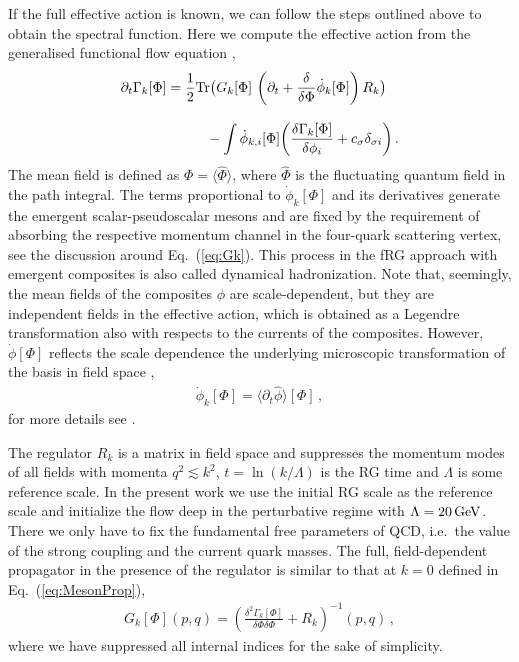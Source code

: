 \documentclass[reprint,english,superscriptaddress,preprintnumbers,amsmath,amssymb,aps,prd,nofootinbib]{revtex4-2}
\def\Eq#1{Eq.~(\ref{#1})}
\begin{document}
If the full effective action is known, we can follow the steps outlined above to obtain the spectral function. Here we compute the effective action from the generalised functional flow equation \cite{Pawlowski:2005xe, Fu:2019hdw}, 
%
\begin{align}\nonumber 
    \partial_t \Gamma_k[\Phi] &= \frac{1}{2}{\rm Tr} \big( G_k[\Phi]\, \left( \partial_t +\frac{\delta}{\delta \Phi} \dot\phi_k[\Phi] \right)  R_k\big)\\[2ex]
   &\hspace{1cm}- \int \dot\phi_{k,i}[\Phi] \bigg(\frac{\delta\Gamma_k[\Phi]}{\delta\phi_i}  + c_\sigma \delta_{\sigma i}\bigg)\,.
   \label{eq:flow}
\end{align}
% 
The mean field is defined as $\Phi = \langle \hat\Phi\rangle$, where $\hat\Phi$ is the fluctuating quantum field in the path integral.
The terms proportional to $\dot \phi_k[\Phi]$ and its derivatives generate the emergent scalar-pseudoscalar mesons and are fixed by the requirement of absorbing the respective momentum channel in the four-quark scattering vertex, see the discussion around \Eq{eq:Gk}. This process in the fRG approach with emergent composites is also called dynamical hadronization. Note that, seemingly, the mean fields of the composites $\phi$ are scale-dependent, but they are independent fields in the effective action, which is obtained as a Legendre transformation also with respects to the currents of the composites. However, $\dot\phi[\Phi]$ reflects the scale dependence the underlying microscopic transformation of the basis in field space \cite{Pawlowski:2005xe}, 
%
\begin{align}
    \dot\phi_k[\Phi] = \langle \partial_t \hat\phi\rangle[\Phi]\,, 
\end{align}
%
for more details see \cite{Pawlowski:2005xe, Fu:2019hdw, Ihssen:2024ihp}. 

The regulator $R_k$ is a matrix in field space and suppresses the momentum modes of all fields with momenta $q^2 \!\lesssim\! k^2$, $t = \ln(k/\Lambda)$ is the RG time and $\Lambda$ is some reference scale. In the present work we use the initial RG scale as the reference scale and initialize the flow deep in the perturbative regime with $\Lambda = 20\, {\rm GeV}$. There we only have to fix the fundamental free parameters of QCD, i.e.\ the value of the strong coupling and the current quark masses. 
The full, field-dependent propagator in the presence of the regulator is similar to that at $k=0$ defined in \Eq{eq:MesonProp},
%
\begin{align}
    G_k[\Phi](p,q) = \left( \frac{\delta^2\Gamma_k[\Phi]}{\delta \Phi\delta\Phi} +R_k\right)^{-1}(p,q)\,,
\label{eq:Gk}
\end{align}
%
where we have suppressed all internal indices for the sake of simplicity. 
\end{document}
